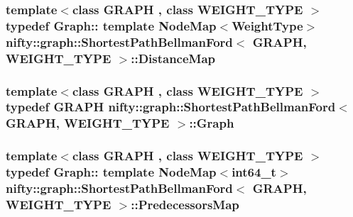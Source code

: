 \subsubsection[{Distance\+Map}]{\setlength{\rightskip}{0pt plus 5cm}template$<$class G\+R\+A\+P\+H , class W\+E\+I\+G\+H\+T\+\_\+\+T\+Y\+P\+E $>$ typedef Graph\+:: template Node\+Map$<${\bf Weight\+Type}$>$ {\bf nifty\+::graph\+::\+Shortest\+Path\+Bellman\+Ford}$<$ G\+R\+A\+P\+H, W\+E\+I\+G\+H\+T\+\_\+\+T\+Y\+P\+E $>$\+::{\bf Distance\+Map}}\label{classnifty_1_1graph_1_1ShortestPathBellmanFord_afb719c11ba9422051fa5650115735e46}
\hypertarget{classnifty_1_1graph_1_1ShortestPathBellmanFord_affd61ff19b32441c605a63759511cfdc}{}
\subsubsection[{Graph}]{\setlength{\rightskip}{0pt plus 5cm}template$<$class G\+R\+A\+P\+H , class W\+E\+I\+G\+H\+T\+\_\+\+T\+Y\+P\+E $>$ typedef G\+R\+A\+P\+H {\bf nifty\+::graph\+::\+Shortest\+Path\+Bellman\+Ford}$<$ G\+R\+A\+P\+H, W\+E\+I\+G\+H\+T\+\_\+\+T\+Y\+P\+E $>$\+::{\bf Graph}}\label{classnifty_1_1graph_1_1ShortestPathBellmanFord_affd61ff19b32441c605a63759511cfdc}
\hypertarget{classnifty_1_1graph_1_1ShortestPathBellmanFord_a871bb54c135ad8324dfff2d4a694372d}{}
\subsubsection[{Predecessors\+Map}]{\setlength{\rightskip}{0pt plus 5cm}template$<$class G\+R\+A\+P\+H , class W\+E\+I\+G\+H\+T\+\_\+\+T\+Y\+P\+E $>$ typedef Graph\+:: template Node\+Map$<$int64\+\_\+t$>$ {\bf nifty\+::graph\+::\+Shortest\+Path\+Bellman\+Ford}$<$ G\+R\+A\+P\+H, W\+E\+I\+G\+H\+T\+\_\+\+T\+Y\+P\+E $>$\+::{\bf Predecessors\+Map}}\label{classnifty_1_1graph_1_1ShortestPathBellmanFord_a871bb54c135ad8324dfff2d4a694372d}
\hypertarget{classnifty_1_1graph_1_1ShortestPathBellmanFord_a0455c814a964983fe8b43278bb7528e8}{}
